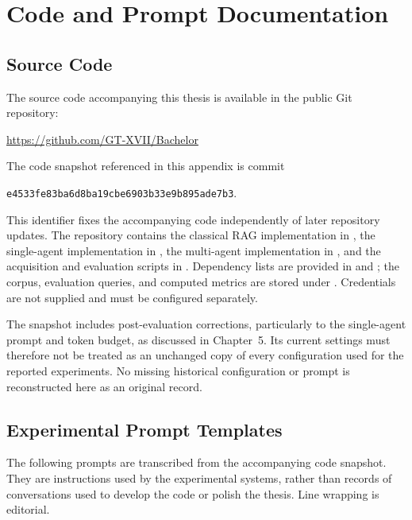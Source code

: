 
\chapter{Code and Prompt Documentation}
\label{app:materials}

\section{Source Code}

The source code accompanying this thesis is available in the public Git repository:
\begin{center}
\url{https://github.com/GT-XVII/Bachelor}
\end{center}
The code snapshot referenced in this appendix is commit
\begin{center}
\nolinkurl{e4533fe83ba6d8ba19cbe6903b33e9b895ade7b3}.
\end{center}
This identifier fixes the accompanying code independently of later repository updates. The repository contains the classical RAG implementation in , the single-agent implementation in , the multi-agent implementation in , and the acquisition and evaluation scripts in . Dependency lists are provided in  and ; the corpus, evaluation queries, and computed metrics are stored under . Credentials are not supplied and must be configured separately.

The snapshot includes post-evaluation corrections, particularly to the single-agent prompt and token budget, as discussed in Chapter~5. Its current settings must therefore not be treated as an unchanged copy of every configuration used for the reported experiments. No missing historical configuration or prompt is reconstructed here as an original record.

\section{Experimental Prompt Templates}

The following prompts are transcribed from the accompanying code snapshot. They are instructions used by the experimental systems, rather than records of conversations used to develop the code or polish the thesis. Line wrapping is editorial.

